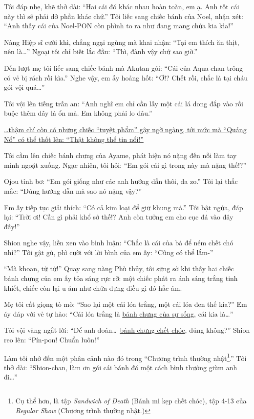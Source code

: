 \documentclass[../main.tex]{subfiles}
\begin{document}
Tôi đáp nhẹ, khẽ thở dài: ``Hai cái đó khác nhau hoàn toàn, em ạ. Anh tốt cái này thì sẽ phải dở phần khác chứ.'' Tôi liếc sang chiếc bánh của Noel, nhận xét: ``Anh thấy cái của Noel-PON còn phình to ra như đang mang chửa kia kìa!''

Nàng Hiệp sĩ cười khì, chẳng ngại ngùng mà khai nhận: ``Tại em thích ăn thịt, nên là\dots'' Ngoại tôi chỉ biết lắc đầu: ``Thì, đành vậy chứ sao giờ.''

Đến lượt mẹ tôi liếc sang chiếc bánh mà Akutan gói: ``Cái của Aqua-chan trông có vẻ bị rách rồi kìa.'' Nghe vậy, em ấy hoảng hốt: ``Ơ!? Chết rồi, chắc là tại cháu gói vội quá\dots''

Tôi vội lên tiếng trấn an: ``Anh nghĩ em chỉ cần lấy một cái lá dong đắp vào rồi buộc thêm dây là ổn mà. Em không phải lo đâu.''

\uline{\dots thậm chí còn có những chiếc ``tuyệt phẩm'' gây ngỡ ngàng, tới mức mà ``Quảng Nổ\footnotemark'' có thể thốt lên: ``Thật không thể tin nổi!''} 

Tôi cầm lên chiếc bánh chưng của Ayame, phát hiện nó nặng đến nỗi làm tay mình ngoặt xuống. Ngạc nhiên, tôi hỏi: ``Em gói cái gì trong này mà nặng thế!?''

Ojou tỉnh bơ: ``Em gói giống như các anh hướng dẫn thôi, da zo.'' Tôi lại thắc mắc: ``Đúng hướng dẫn mà sao nó nặng vậy?''

Em ấy tiếp tục giải thích: ``Có cả kim loại để giữ khung mà.'' Tôi bật ngửa, đáp lại: ``Trời ơi! Cần gì phải khổ sở thế!? Anh còn tưởng em cho cục đá vào đây đấy!''

Shion nghe vậy, liền xen vào bình luận: ``Chắc là cái của bà để ném chết chó nhỉ?'' Tôi gật gù, phì cười với lời bình của em ấy: ``Cũng có thể lắm-''

``Mà khoan, từ từ!'' Quay sang nàng Phù thủy, tôi sững sờ khi thấy hai chiếc bánh chưng của em ấy tỏa sáng rực rỡ: một chiếc phát ra ánh sáng trắng tinh khiết, chiếc còn lại u ám như chứa đựng điều gì đó hắc ám.

Mẹ tôi cất giọng tò mò: ``Sao lại một cái lóa trắng, một cái lóa đen thế kia?'' Em áy đáp với vẻ tự hào: ``Cái lóa trắng là \uline{bánh chưng của sự sống}, cái kia là\dots''

Tôi vội vàng ngắt lời: ``Để anh đoán\dots\ \uline{bánh chưng chết chóc}, đúng không?'' Shion reo lên: ``Pín-pon! Chuẩn luôn!''

Làm tôi nhớ đến một phân cảnh nào đó trong ``Chương trình thường nhật\footnote{Cụ thể hơn, là tập \textit{Sandwich of Death} (Bánh mì kẹp chết chóc), tập 4-13 của \textit{Regular Show} (Chương trình thường nhật.)}.'' Tôi thở dài: ``Shion-chan, làm ơn gói cái bánh đó một cách bình thường giùm anh đi\dots''
\end{document}
